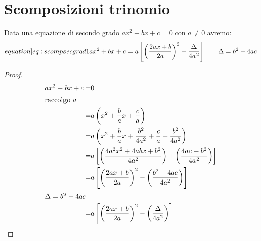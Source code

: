 \chapter{Scomposizioni trinomio}
\begin{thm}\label{thm:scompsecgrad1}
Data 	una equazione di secondo grado $ax^2+bx+c=0$ con $a\neq 0$ avremo:\begin{equation}\label[equation]{eq:scompsecgrad1}
ax^2+bx+c=a\left[\left(\dfrac{2ax+b}{2a}\right)^2-\dfrac{\Delta}{4a^2}\right]\qquad\Delta=b^2-4ac
\end{equation}
\end{thm}
\begin{proof}
	\begin{align*}
	ax^2+bx+c=&0\\
	\intertext{raccolgo $a$}
	=&a\left(x^2+\frac{b}{a}x+\frac{c}{a}\right)\\
	=&a\left(x^2+\frac{b}{a}x+\frac{b^2}{4a^2}+\frac{c}{a}-\frac{b^2}{4a^2}\right)\\
	=&a\left[\left(\frac{4a^2x^2+4abx+b^2}{4a^2}\right)+\left(\frac{4ac-b^2}{4a^2}\right)\right]\\
	=&a\left[\left(\frac{2ax+b}{2a}\right)^2-\left(\frac{b^2-4ac}{4a^2}\right)\right]\\
	\intertext{$\Delta=b^2-4ac$}
	=&a\left[\left(\frac{2ax+b}{2a}\right)^2-\left(\frac{\Delta}{4a^2}\right)\right]
	\end{align*}
\end{proof}